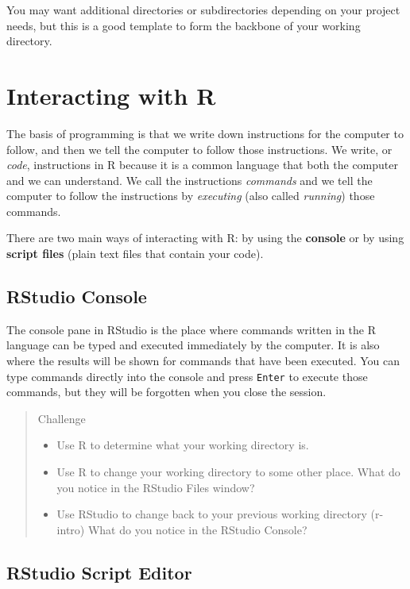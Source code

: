 \documentclass[]{book}
\providecommand{\tightlist}{%
  \setlength{\itemsep}{0pt}\setlength{\parskip}{0pt}}
\theoremstyle{definition}
\theoremstyle{definition}
\theoremstyle{remark}
\begin{document}
You may want additional directories or subdirectories depending on your
project needs, but this is a good template to form the backbone of your
working directory.

\section{Interacting with R}\label{interacting-with-r}

The basis of programming is that we write down instructions for the
computer to follow, and then we tell the computer to follow those
instructions. We write, or \emph{code}, instructions in R because it is
a common language that both the computer and we can understand. We call
the instructions \emph{commands} and we tell the computer to follow the
instructions by \emph{executing} (also called \emph{running}) those
commands.

There are two main ways of interacting with R: by using the
\textbf{console} or by using \textbf{script files} (plain text files
that contain your code).

\subsection{RStudio Console}\label{rstudio-console}

The console pane in RStudio is the place where commands written in the R
language can be typed and executed immediately by the computer. It is
also where the results will be shown for commands that have been
executed. You can type commands directly into the console and press
\texttt{Enter} to execute those commands, but they will be forgotten
when you close the session.

\begin{quote}
Challenge

\begin{itemize}
\tightlist
\item
  Use R to determine what your working directory is.
\item
  Use R to change your working directory to some other place. What do
  you notice in the RStudio Files window?
\item
  Use RStudio to change back to your previous working directory
  (r-intro) What do you notice in the RStudio Console?
\end{itemize}
\end{quote}

\subsection{RStudio Script Editor}\label{rstudio-script-editor}
\end{document}
